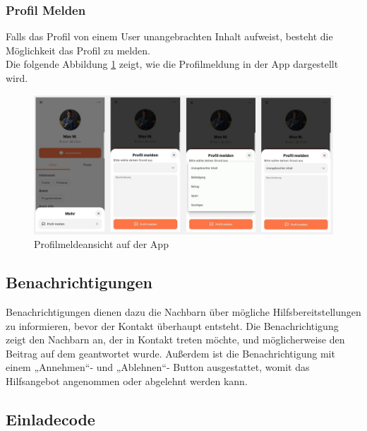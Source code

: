 \subsubsection{Profil Melden}
Falls das Profil von einem User unangebrachten Inhalt aufweist, besteht die Möglichkeit das Profil zu melden.
\\
Die folgende Abbildung \ref{fig:report-profile} zeigt, wie die Profilmeldung in der App dargestellt wird.

\begin{figure}[H]
  \centering
  \includegraphics[width=1\textwidth]{pics/report-profile.JPG}
  \caption{Profilmeldeansicht auf der App}
  \label{fig:report-profile}
\end{figure}


\subsection{Benachrichtigungen}
Benachrichtigungen dienen dazu die Nachbarn über mögliche
Hilfsbereitstellungen zu informieren, bevor der Kontakt
überhaupt entsteht. Die Benachrichtigung zeigt den Nachbarn
an, der in Kontakt treten möchte, und möglicherweise den
Beitrag auf dem geantwortet wurde. Außerdem ist die
Benachrichtigung mit einem „Annehmen“- und „Ablehnen“-
Button ausgestattet, womit das Hilfsangebot angenommen oder
abgelehnt werden kann.

\subsection{Einladecode}

